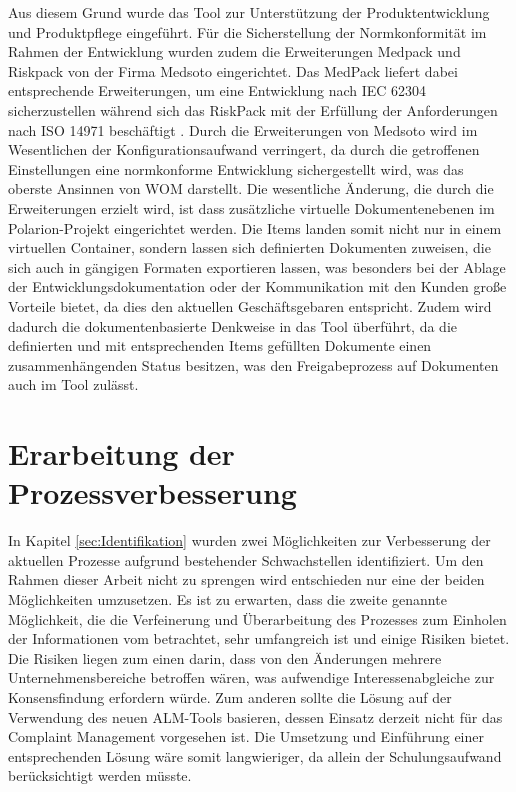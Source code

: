 \documentclass[a4paper,12pt]{report}
\begin{document}
Aus diesem Grund wurde das Tool zur Unterstützung der Produktentwicklung und Produktpflege eingeführt. Für die Sicherstellung der Normkonformität im Rahmen der Entwicklung wurden zudem die Erweiterungen Medpack und Riskpack von der Firma Medsoto eingerichtet. Das MedPack liefert dabei entsprechende Erweiterungen, um eine Entwicklung nach IEC 62304 sicherzustellen \citep[vgl.][]{MedsotoMed} während sich das RiskPack mit der Erfüllung der Anforderungen nach ISO 14971 beschäftigt \citep[vgl.][]{MedsotoRisk}. Durch die Erweiterungen von Medsoto wird im Wesentlichen der Konfigurationsaufwand verringert, da durch die getroffenen Einstellungen eine normkonforme Entwicklung sichergestellt wird, was das oberste Ansinnen von WOM darstellt. Die wesentliche Änderung, die durch die Erweiterungen erzielt wird, ist dass zusätzliche virtuelle Dokumentenebenen im Polarion-Projekt eingerichtet werden. Die Items landen somit nicht nur in einem virtuellen Container, sondern lassen sich definierten Dokumenten zuweisen, die sich auch in gängigen Formaten exportieren lassen, was besonders bei der Ablage der Entwicklungsdokumentation oder der Kommunikation mit den Kunden große Vorteile bietet, da dies den aktuellen Geschäftsgebaren entspricht. Zudem wird dadurch die dokumentenbasierte Denkweise in das Tool überführt, da die definierten und mit entsprechenden Items gefüllten Dokumente einen zusammenhängenden Status besitzen, was den Freigabeprozess auf Dokumenten auch im Tool zulässt.
\section{Erarbeitung der Prozessverbesserung}
In Kapitel \ref{sec:Identifikation} wurden zwei Möglichkeiten zur Verbesserung der aktuellen Prozesse aufgrund bestehender Schwachstellen identifiziert. Um den Rahmen dieser Arbeit nicht zu sprengen wird entschieden nur eine der beiden Möglichkeiten umzusetzen. Es ist zu erwarten, dass die zweite genannte Möglichkeit, die die Verfeinerung und Überarbeitung des Prozesses zum Einholen der Informationen vom \FE betrachtet, sehr umfangreich ist und einige Risiken bietet. Die Risiken liegen zum einen darin, dass von den Änderungen mehrere Unternehmensbereiche betroffen wären, was aufwendige Interessenabgleiche zur Konsensfindung erfordern würde. Zum anderen sollte die Lösung auf der Verwendung des neuen ALM-Tools basieren, dessen Einsatz derzeit nicht für das Complaint Management vorgesehen ist. Die Umsetzung und Einführung einer entsprechenden Lösung wäre somit langwieriger, da allein der Schulungsaufwand berücksichtigt werden müsste.
\end{document}
